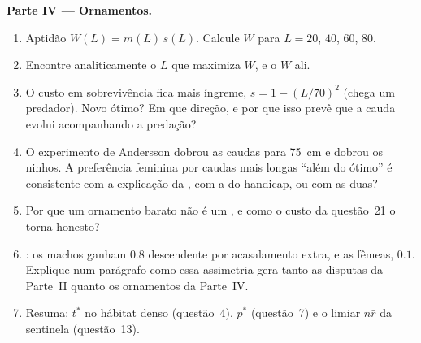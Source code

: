 \begin{problem}
\medskip
\noindent\textbf{Parte IV --- Ornamentos.}
\begin{enumerate}[resume]
  \item Aptidão $W(L) = m(L)\,s(L)$. Calcule $W$ para $L = 20$, $40$,
        $60$, $80$.
  \item Encontre analiticamente o $L$ que maximiza $W$, e o $W$ ali.
  \item O custo em sobrevivência fica mais íngreme, $s = 1 - (L/70)^{2}$
        (chega um predador). Novo ótimo? Em que direção, e por que isso
        prevê que a cauda evolui acompanhando a predação?
  \item O experimento de Andersson dobrou as caudas para \qty{75}{cm} e
        dobrou os ninhos. A preferência feminina por caudas mais longas
        ``além do ótimo'' é consistente com a explicação da , com a do handicap, ou com as duas?
  \item Por que um ornamento barato não é um , e como o
        custo da questão~21 o torna honesto?
  \item {}: os machos ganham $0.8$ descendente por
        acasalamento extra, e as fêmeas, $0.1$. Explique num parágrafo
        como essa assimetria gera tanto as disputas da Parte~II quanto os
        ornamentos da Parte~IV.
  \item Resuma: $t^{*}$ no hábitat denso (questão~4), $p^{*}$
        (questão~7) e o limiar $n\bar r$ da sentinela (questão~13).
\end{enumerate}
\end{problem}
